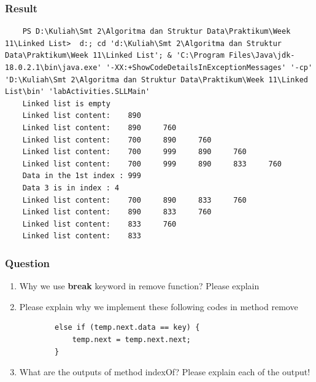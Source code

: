 \documentclass[12pt,titlepage]{article}
\begin{document}
\subsubsection{Result}
\begin{verbatim}
    PS D:\Kuliah\Smt 2\Algoritma dan Struktur Data\Praktikum\Week 11\Linked List>  d:; cd 'd:\Kuliah\Smt 2\Algoritma dan Struktur Data\Praktikum\Week 11\Linked List'; & 'C:\Program Files\Java\jdk-18.0.2.1\bin\java.exe' '-XX:+ShowCodeDetailsInExceptionMessages' '-cp' 'D:\Kuliah\Smt 2\Algoritma dan Struktur Data\Praktikum\Week 11\Linked List\bin' 'labActivities.SLLMain' 
    Linked list is empty
    Linked list content:    890
    Linked list content:    890     760
    Linked list content:    700     890     760
    Linked list content:    700     999     890     760
    Linked list content:    700     999     890     833     760
    Data in the 1st index : 999
    Data 3 is in index : 4
    Linked list content:    700     890     833     760
    Linked list content:    890     833     760
    Linked list content:    833     760
    Linked list content:    833
\end{verbatim}

\subsubsection{Question}
\begin{enumerate}
    \item Why we use \textbf{break} keyword in remove function? Please explain
    \item Please explain why we implement these following codes in method remove
    \begin{verbatim}
        else if (temp.next.data == key) {
            temp.next = temp.next.next;
        }
    \end{verbatim}
    \item What are the outputs of method indexOf? Please explain each of the output!
\end{enumerate}
\end{document}

